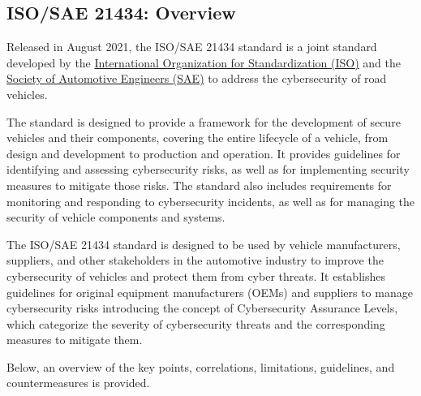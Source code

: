 \subsection{ISO/SAE 21434: Overview}\label{subsec:iso-sae-21434}

Released in August 2021, the ISO/SAE 21434 standard is a joint standard
developed by the \href{https://www.iso.org/home.html}{International Organization for Standardization (ISO)} and the
\href{https://www.sae.org/}{Society of Automotive Engineers (SAE)} to address the cybersecurity of road vehicles.

The standard is designed to provide a framework for the development of secure vehicles and their components,
covering the entire lifecycle of a vehicle, from design and development to production and operation.
It provides guidelines for identifying and assessing cybersecurity risks, as well as for implementing security measures to mitigate those risks.
The standard also includes requirements for monitoring and responding to cybersecurity incidents, as well as for managing the security of vehicle components and systems.

The ISO/SAE 21434 standard is designed to be used by vehicle manufacturers,
suppliers, and other stakeholders in the automotive industry to improve the cybersecurity of vehicles and protect them from cyber threats\cite{iso-correlation}.
It establishes guidelines for original equipment manufacturers (OEMs) and suppliers to manage cybersecurity risks introducing the concept of Cybersecurity Assurance Levels,
which categorize the severity of cybersecurity threats and the corresponding measures to mitigate them\cite{moukahal2021towards}.

Below, an overview of the key points, correlations, limitations, guidelines, and countermeasures is provided.

